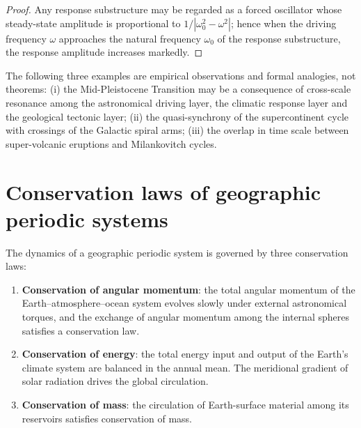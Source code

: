 \begin{proof}
Any response substructure may be regarded as a forced oscillator whose steady-state amplitude is proportional to $1/|\omega_0^2-\omega^2|$; hence when the driving frequency $\omega$ approaches the natural frequency $\omega_0$ of the response substructure, the response amplitude increases markedly.
\end{proof}

\begin{remark}\label{rem:geo_cross_scale_empirical}
The following three examples are empirical observations and formal analogies, not theorems: (i) the Mid-Pleistocene Transition may be a consequence of cross-scale resonance among the astronomical driving layer, the climatic response layer and the geological tectonic layer; (ii) the quasi-synchrony of the supercontinent cycle with crossings of the Galactic spiral arms; (iii) the overlap in time scale between super-volcanic eruptions and Milankovitch cycles.
\end{remark}

\section{Conservation laws of geographic periodic systems}
\label{sec:geo_conservation}

\begin{theorem}\label{thm:geographic_conservation_laws}
The dynamics of a geographic periodic system is governed by three conservation laws:
\begin{enumerate}[label=(\roman*)]
    \item \textbf{Conservation of angular momentum}: the total angular momentum of the Earth--atmosphere--ocean system evolves slowly under external astronomical torques, and the exchange of angular momentum among the internal spheres satisfies a conservation law.
    \item \textbf{Conservation of energy}: the total energy input and output of the Earth's climate system are balanced in the annual mean. The meridional gradient of solar radiation drives the global circulation.
    \item \textbf{Conservation of mass}: the circulation of Earth-surface material among its reservoirs satisfies conservation of mass.
\end{enumerate}
\end{theorem}

